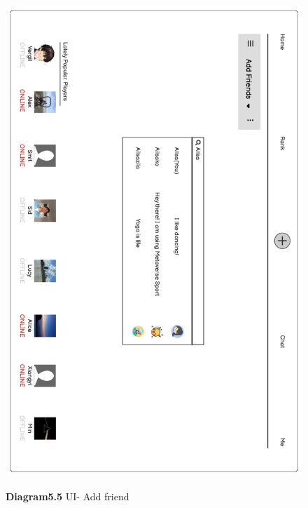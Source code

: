 \documentclass[a4paper]{article}
\begin{document}
	\begin{figure}[H]
		\centering
		\caption*{\textbf{Diagram5.5} UI- Add friend}
		\includegraphics[width=1\textwidth]{images/UI_Final/UI_Final_5.pdf}
		\label{UI_5}
	\end{figure}
\end{document}
